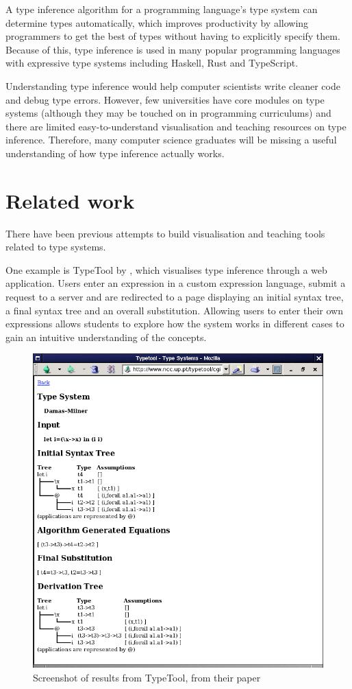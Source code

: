 \documentclass[a4paper,fleqn,oneside,12pt]{report}
\begin{document}
A type inference algorithm for a programming language's type system can determine types automatically, which improves productivity by allowing programmers to get the best of types without having to explicitly specify them. Because of this, type inference is used in many popular programming languages with expressive type systems including Haskell, Rust and TypeScript.

Understanding type inference would help computer scientists write cleaner code and debug type errors. However, few universities have core modules on type systems (although they may be touched on in programming curriculums) and there are limited easy-to-understand visualisation and teaching resources on type inference. Therefore, many computer science graduates will be missing a useful understanding of how type inference actually works.

\section{Related work}\label{id:h.2mwaav7jkal4}

There have been previous attempts to build visualisation and teaching tools related to type systems.

One example is TypeTool by \cite{ref4}, which visualises type inference through a web application. Users enter an expression in a custom expression language, submit a request to a server and are redirected to a page displaying an initial syntax tree, a final syntax tree and an overall substitution. Allowing users to enter their own expressions allows students to explore how the system works in different cases to gain an intuitive understanding of the concepts.

{\centering \begin{figure}[h!]
  \centering
  \includegraphics[width=0.75\linewidth]{images/image29.png}
  \caption{Screenshot of results from TypeTool, from their paper}
\end{figure} \par}
\end{document}
